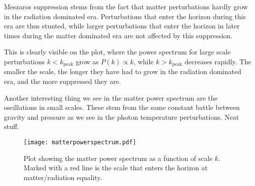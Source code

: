 \documentclass[12pt]{article}
\begin{document}
Meszaros suppression stems from the fact that matter perturbations hardly grow in the radiation dominated era. Perturbations that enter the horizon during this era are thus stunted, while larger perturbations that enter the horizon in later times during the matter dominated era are not affected by this suppression. 

This is clearly visible on the plot, where the power spectrum for large scale perturbations $k < k_{\mathrm{peak}}$ grow as $P(k) \propto k$, while $k > k_{\mathrm{peak}}$ decreases rapidly. The smaller the scale, the longer they have had to grow in the radiation dominated era, and the more suppressed they are.

Another interesting thing we see in the matter power spectrum are the oscillations in small scales. These stem from the same constant battle between gravity and pressure as we see in the photon temperature perturbations. Neat stuff.

\begin{figure}[h]
    \centering
    \texttt{[image: matterpowerspectrum.pdf]} 
    \caption{Plot showing the matter power spectrum as a function of scale $k$. Marked with a red line is the scale that enters the horizon at matter/radiation equality.}
    \label{fig:matter power spectrum}
\end{figure}

{}

\end{document}
